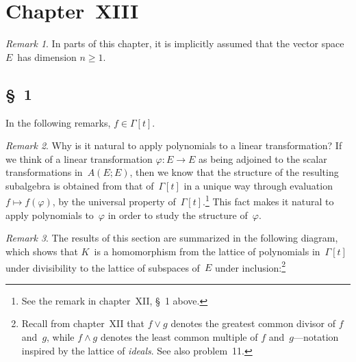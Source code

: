 \documentclass[letterpaper,12pt]{article}
\newcommand{\sect}{\cap}
\newcommand{\join}{\vee}
\newcommand{\meet}{\wedge}
\theoremstyle{definition}
\theoremstyle{remark}
\newtheorem*{rmk}{Remark}
\begin{document}
\section*{Chapter~XIII}
\begin{rmk}
In parts of this chapter, it is implicitly assumed that the vector space \(E\)~has dimension \(n\ge 1\).
\end{rmk}

\subsection*{\S~1}
In the following remarks, \(f\in\Gamma[t]\).
\begin{rmk}
Why is it natural to apply polynomials to a linear transformation? If we think of a linear transformation \(\varphi:E\to E\) as being adjoined to the scalar transformations in~\(A(E;E)\), then we know that the structure of the resulting subalgebra is obtained from that of~\(\Gamma[t]\) in a unique way through evaluation \(f\mapsto f(\varphi)\), by the universal property of~\(\Gamma[t]\).\footnote{See the remark in chapter~XII, \S~1 above.} This fact makes it natural to apply polynomials to~\(\varphi\) in order to study the structure of~\(\varphi\).
\end{rmk}

\begin{rmk}
The results of this section are summarized in the following diagram, which shows that \(K\)~is a homomorphism from the lattice of polynomials in~\(\Gamma[t]\) under divisibility to the lattice of subspaces of~\(E\) under inclusion:\footnote{Recall from chapter~XII that \(f\join g\) denotes the greatest common divisor of \(f\) and~\(g\), while \(f\meet g\) denotes the least common multiple of \(f\) and~\(g\)---notation inspired by the lattice of \emph{ideals}. See also problem~11.}
\begin{center}
\end{center}
\end{rmk}
\end{document}
